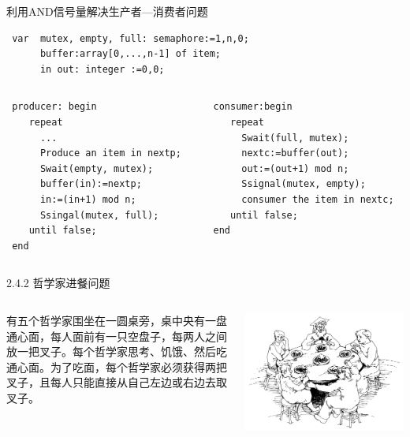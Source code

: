  \begin{frame}[fragile]{利用AND信号量解决生产者—消费者问题}
 \begin{verbatim}
 var  mutex, empty, full: semaphore:=1,n,0;
      buffer:array[0,...,n-1] of item;
      in out: integer :=0,0;
 \end{verbatim}

 \begin{columns}[onlytextwidth,T]
 \begin{column}{0.46 \textwidth}
 \begin{verbatim}
 producer: begin
    repeat
      ...
      Produce an item in nextp;
      Swait(empty, mutex);
      buffer(in):=nextp;
      in:=(in+1) mod n;
      Ssingal(mutex, full);
    until false;
 end
 \end{verbatim}
 \end{column}
 \begin{column}{0.46 \textwidth}
 \begin{verbatim}
 consumer:begin
    repeat
      Swait(full, mutex);
      nextc:=buffer(out);
      out:=(out+1) mod n;
      Ssignal(mutex, empty);
      consumer the item in nextc;
    until false;
 end
 \end{verbatim}
 \end{column}
 \end{columns}
\end{frame}


\begin{frame}[fragile]{2.4.2 哲学家进餐问题}
  \begin{columns}[onlytextwidth,T]
    \par 有五个哲学家围坐在一圆桌旁，桌中央有一盘通心面，每人面前有一只空盘子，每两人之间放一把叉子。每个哲学家思考、饥饿、然后吃通心面。为了吃面，每个哲学家必须获得两把叉子，且每人只能直接从自己左边或右边去取叉子。

    \includegraphics[width=1.0\textwidth]{figure/dining.jpg}
  \end{columns}
\end{frame}

